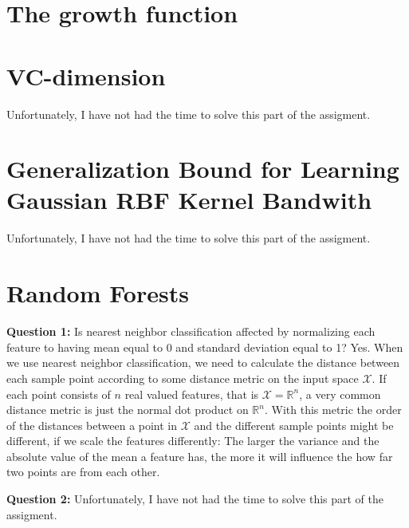 \documentclass[12pt]{article}
\begin{document}
\section{The growth function}



\section{VC-dimension}

Unfortunately, I have not had the time to solve this part of the assigment.

\section{Generalization Bound for Learning Gaussian RBF Kernel Bandwith}

Unfortunately, I have not had the time to solve this part of the assigment.

\section{Random Forests}

\textbf{Question 1:} Is nearest neighbor classification affected by normalizing each feature to having mean equal to 0 and standard deviation equal to 1? Yes. When we use nearest neighbor classification, we need to calculate the distance between each sample point according to some distance metric on the input space $\mathcal{X}$. If each point consists of $n$ real valued features, that is $\mathcal{X}=\mathbb{R}^n$, a very common distance metric is just the normal dot product on $\mathbb{R}^n$. With this metric the order of the distances between a point in $\mathcal{X}$ and the different sample points might be different, if we scale the features differently: The larger the variance and the absolute value of the mean a feature has, the more it will influence the how far two points are from each other. 

\textbf{Question 2:} Unfortunately, I have not had the time to solve this part of the assigment.
\end{document}
